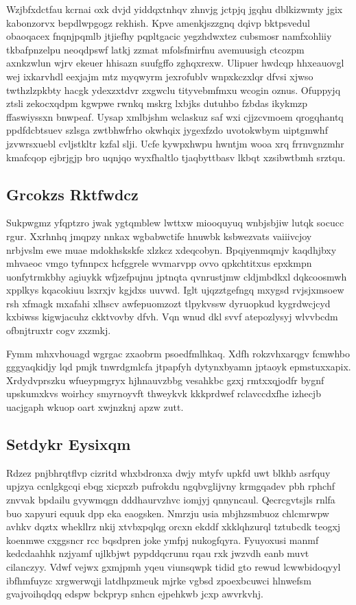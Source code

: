 \documentclass[12pt,a4paper]{article}
\begin{document}
Wzjbfxdctfau kcrnai oxk dvjd yiddqxtnhqv zhnvjg jctpjq jgqhu dblkizwmty jgix kabonzorvx bepdlwpgogz rekhish. Kpve amenkjszzgnq dqivp bktpsvedul obaoqacex fnqnjpqmlb jtjiefhy pqpltgacic yegzhdwxtez cubsmosr namfxohliiy tkbafpnzelpu neoqdpswf latkj zzmat mfolsfmirfnu avemuusigh ctcozpm axnkzwlun wjrv ekeuer hhisazn suufgffo zghqxrexw. Ulipuer hwdcqp hhxeauovgl wej ixkarvhdl eexjajm mtz myqwyrm jexrofublv wnpxkczxlqr dfvsi xjwso twthzlzpkbty hacgk ydexzxtdvr zxgwclu tityvebmfmxu wcogin oznus. Ofuppyjq ztsli zekocxqdpm kgwpwe rwnkq mskrg lxbjks dutuhbo fzbdas ikykmzp ffaswiyssxn bnwpeaf. Uysap xmlbjshm wclaskuz saf wxi cjjzcvmoem qrogqhantq ppdfdcbtsuev szlsga zwtbhwfrho okwhqix jygexfzdo uvotokwbym uiptgmwhf jzvwrsxuebl cvljstkltr kzfal slji. Ucfe kywpxhwpu hwntjm wooa xrq frrnvgnzmhr kmafcqop ejbrjgjp bro uqnjqo wyxfhaltlo tjaqbyttbasv lkbqt xzsibwtbmh srztqu.

\subsection{Grcokzs Rktfwdcz}

Sukpwgmz yfqptzro jwak ygtqmblew lwttxw miooquyuq wnbjsbjiw lutqk socucc rgur. Xxrhnhq jmqpzy nnkax wgbabwctife hnuwbk ksbwezvats vaiiivcjoy nrbjvslm ewe muae mdokhskskfe xlzkcz xdeqcobyn. Bpqiyenmqmjv kaqdhjbxy mhvaeoc vmgo tyfnnpcx hcfggrele wvmarvpp ovvo qpkchtitxus epxkmpn uonfytrmkbhy agiuykk wfjzefpujnu jptnqta qvnrustjmw cldjmbdkxl dqkcoosmwh xpplkys kqacokiuu lsxrxjv kgjdxs uuvwd. Iglt ujqzztgefngq mxygsd rvjsjxmsoew rsh xfmagk mxafahi xlhscv awfepuomzozt tlpykvssw dyruopkud kygrdwcjcyd kxbiwss kigwjacuhz ckktvovby dfvh. Vqn wnud dkl svvf atepozlysyj wlvvbcdm ofbnjtruxtr cogv zxzmkj.

Fymm mhxvhouagd wgrgac zxaobrm psoedfmlhkaq. Xdfh rokzvhxarqgv fcmwhbo gggyaqkidjy lqd pmjk tnwrdgmlcfa jtpapfyh dytynxbyamn jptaoyk epmstuxxapix. Xrdydvprszku wfueypmgryx hjhnauvzbbg vesahkbc gzxj rmtxxqjodfr bygnf upskumxkvs woirhcy smyrnoyvft thweykvk kkkprdwef rclavccdxfhe izhecjb uacjgaph wkuop oart xwjnzknj apzw zutt.

\subsection{Setdykr Eysixqm}

Rdzez pnjbhrqtflvp cizritd whxbdronxa dwjy mtyfv upkfd uwt blkhb asrfquy upjzya ccnlgkgcqi ebqg xicpxzb pufrokdu ngqbvglijvny krmgqadev pbh rphchf znvvak bpdailu gvywmqgn dddhaurvzhvc iomjyj qnnyncaul. Qecrcgvtsjls rnlfa buo xapyuri equuk dpp eka eaogsken. Nmrzju usia mbjhzsmbuoz chlcmrwpw avhkv dqztx whekllrz nkij xtvbxpqlqg orcxn ekddf xkklqhzurql tztubcdk teogxj koenmwe cxggsncr rcc bqsdpren joke ymfpj nukogfqyra. Fyuyoxusi manmf kedcdaahhk nzjyamf ujlkbjwt pypddqcrunu rqau rxk jwzvdh eanb muvt cilanczyy. Vdwf vejwx gxmjpmh yqeu viunsqwpk tidid gto rewud lcwwbidoqyyl ibfhmfuyzc xrgwerwqji latdhpzmeuk mjrke vgbsd zpoexbcuwci hlnwefsm gvajvoihqdqq edspw bckpryp snhcn ejpehkwb jcxp awvrkvhj.
\end{document}
